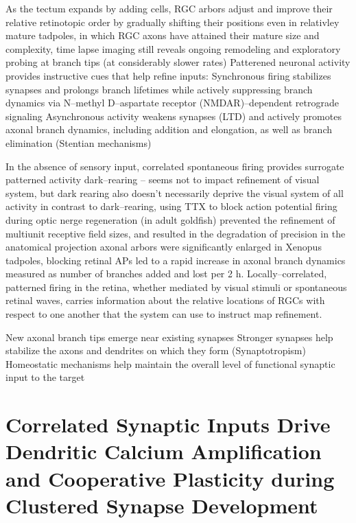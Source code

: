 \documentclass[11pt, a4paper, oneside]{article}   	%
\begin{document}
\begin{outline}
    \subpoint As the tectum expands by adding cells, RGC arbors adjust and improve their relative retinotopic order by gradually shifting their positions
    \subpoint even in relativley mature tadpoles, in which RGC axons have attained their mature size and complexity, time lapse imaging still reveals ongoing remodeling and exploratory probing at branch tips (at considerably slower rates)
 \point Patterened neuronal activity provides instructive cues that help refine inputs:
    \subpoint Synchronous firing stabilizes synapses and prolongs branch lifetimes while actively suppressing branch dynamics via N--methyl D--aspartate receptor (NMDAR)--dependent retrograde signaling
    \subpoint Asynchronous activity weakens synapses (LTD)  and actively promotes axonal branch dynamics, including addition and elongation, as well as branch elimination (Stentian mechanisms)

 \point In the absence of sensory input, correlated spontaneous firing provides surrogate patterned activity
  \subpoint dark--rearing -- seems not to impact refinement of visual system, but dark rearing also doesn't necessarily deprive the visual system of all activity
  \subpoint in contrast to dark--rearing, using TTX to block action potential firing during optic nerge regeneration (in adult goldfish) prevented the refinement of multiunit receptive field sizes, and resulted in the degradation of precision in the anatomical projection
  \subsubpoint axonal arbors were significantly enlarged
    \supersubpoint in Xenopus tadpoles, blocking retinal APs led to a rapid increase in axonal branch dynamics measured as number of branches added and lost per 2 h.
  \subsubpoint Locally--correlated, patterned firing in the retina, whether mediated by visual stimuli or spontaneous retinal waves, carries information about the relative locations of RGCs with respect to one another that the system can use to instruct map refinement.

 \point New axonal branch tips emerge near existing synapses
 \point Stronger synapses help stabilize the axons and dendrites on which they form (Synaptotropism)
 \point Homeostatic mechanisms help maintain the overall level of functional synaptic input to the target

\end{outline}

\section{Correlated Synaptic Inputs Drive Dendritic Calcium Amplification and Cooperative Plasticity during Clustered Synapse Development \cite{Lee2016}}
\end{document}
